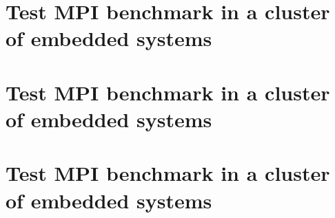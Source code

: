 \section{Test MPI benchmark in a cluster of embedded systems}

\section{Test MPI benchmark in a cluster of embedded systems}

\section{Test MPI benchmark in a cluster of embedded systems}
\clearpage
